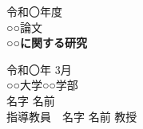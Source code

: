 \thispagestyle{empty}
\begin{center} 
\vspace{20mm}
{\LARGE\noindent 令和〇年度}\\
\vspace{5mm}   
{\huge\noindent ○○論文}\\
\vspace{40mm}
{\Huge\noindent\textbf{○○に関する研究}}\\
\vspace{\baselineskip}
\vspace{60mm}

{\LARGE\noindent        
令和〇年 3月\\
\vspace{\baselineskip}
\vspace{\baselineskip}  
○○大学○○学部\\
\vspace{\baselineskip}
名字 名前\\
\vspace{\baselineskip}  
\vspace{\baselineskip}  
指導教員　名字 名前 教授\\
}

\end{center}
\clearpage 